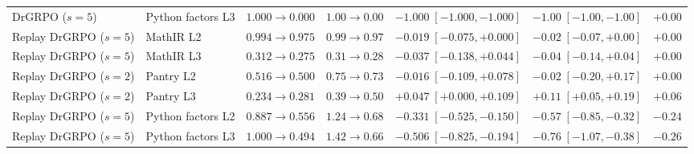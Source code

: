 \begin{table}[t]
\begin{tabular}{llrrrrr}
DrGRPO ($s=5$) & Python factors L3 & $1.000\to0.000$ & $1.00\to0.00$ & $-1.000\;[-1.000,-1.000]$ & $-1.00\;[-1.00,-1.00]$ & $+0.00$ \\
Replay DrGRPO ($s=5$) & MathIR L2 & $0.994\to0.975$ & $0.99\to0.97$ & $-0.019\;[-0.075,+0.000]$ & $-0.02\;[-0.07,+0.00]$ & $+0.00$ \\
Replay DrGRPO ($s=5$) & MathIR L3 & $0.312\to0.275$ & $0.31\to0.28$ & $-0.037\;[-0.138,+0.044]$ & $-0.04\;[-0.14,+0.04]$ & $+0.00$ \\
Replay DrGRPO ($s=2$) & Pantry L2 & $0.516\to0.500$ & $0.75\to0.73$ & $-0.016\;[-0.109,+0.078]$ & $-0.02\;[-0.20,+0.17]$ & $+0.00$ \\
Replay DrGRPO ($s=2$) & Pantry L3 & $0.234\to0.281$ & $0.39\to0.50$ & $+0.047\;[+0.000,+0.109]$ & $+0.11\;[+0.05,+0.19]$ & $+0.06$ \\
Replay DrGRPO ($s=5$) & Python factors L2 & $0.887\to0.556$ & $1.24\to0.68$ & $-0.331\;[-0.525,-0.150]$ & $-0.57\;[-0.85,-0.32]$ & $-0.24$ \\
Replay DrGRPO ($s=5$) & Python factors L3 & $1.000\to0.494$ & $1.42\to0.66$ & $-0.506\;[-0.825,-0.194]$ & $-0.76\;[-1.07,-0.38]$ & $-0.26$ \\
\bottomrule
\end{tabular}
\end{table}


